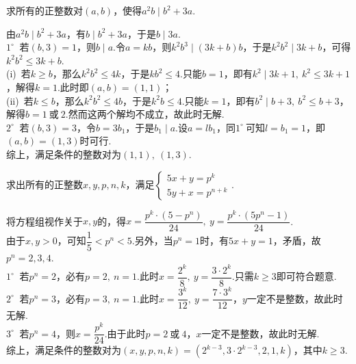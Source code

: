 \documentclass[cn,hazy,black,10pt,normal]{elegantnote}
\newcommand{\cor}{~\textit{或}~}
\newcommand{\buzhou}[1]{$#1^{\circ} \ $}
\begin{document}
\begin{problem} %
	求所有的正整数对$(a,b)$，使得$a^2b \mid b^2+3a$.
\end{problem}
\begin{solution}
	由$a^2b \mid b^2+3a$，有$b \mid b^2+3a$，于是$b \mid 3a$. \\
	\buzhou{1} 若$(b,3)=1$，则$b \mid a$.令$a=kb$，则$k^2b^3 \mid (3k+b)b$，于是$k^2b^2 \mid 3k+b$，可得$k^2b^2 \leq 3k+b$. \\
	(i)~若$k \geq b$，那么$k^2b^2 \leq 4k$，于是$kb^2 \leq 4$.只能$b=1$，即有$k^2 \mid 3k+1,~k^2 \leq 3k+1$，解得$k=1$.此时即$(a,b)=(1,1)$； \\
	(ii)~若$k \leq b$，那么$k^2b^2 \leq 4b$，于是$k^2b \leq 4$.只能$k=1$，即有$b^2 \mid b+3,~b^2 \leq b+3$，解得$b=1\cor 2$.然而这两个解均不成立，故此时无解. \\
	\buzhou{2} 若$(b,3)=3$，令$b=3b_1$，于是$b_1 \mid a$.设$a=l b_1$，同\buzhou{1}可知$l=b_1=1$，即$(a,b)=(1,3)$时可行. \\
	综上，满足条件的整数对为$(1,1),~(1,3)$.
\end{solution}

\begin{problem} %
	求出所有的正整数$x,y,p,n,k$，满足$\begin{cases}
		5x+y=p^k \\ 5y+x=p^{n+k}
	\end{cases}$.
\end{problem}
\begin{solution}
	将方程组视作关于$x,y$的，得$x=\dfrac{p^k \cdot (5-p^n)}{24},~y=\dfrac{p^k \cdot (5p^n-1)}{24}$. \\
	由于$x,y>0$，可知$\dfrac{1}{5} < p^n < 5$.另外，当$p^n=1$时，有$5x+y=1$，矛盾，故$p^n=2,3,4$. \\
	\buzhou{1} 若$p^n=2$，必有$p=2,~n=1$.此时$x=\dfrac{2^k}{8},~y=\dfrac{3 \cdot 2^k}{8}$.只需$k \geq 3$即可符合题意. \\
	\buzhou{2} 若$p^n=3$，必有$p=3,~n=1$.此时$x=\dfrac{3^k}{12},~y=\dfrac{7 \cdot 3^k}{12}$，$y$一定不是整数，故此时无解. \\
	\buzhou{3} 若$p^n=4$，则$x=\dfrac{p^k}{24}$.由于此时$p=2\cor 4$，$x$一定不是整数，故此时无解. \\
	综上，满足条件的整数对为$(x,y,p,n,k)=(2^{k-3},3\cdot 2^{k-3},2,1,k)$，其中$k \geq 3$.
\end{solution}
\end{document}
